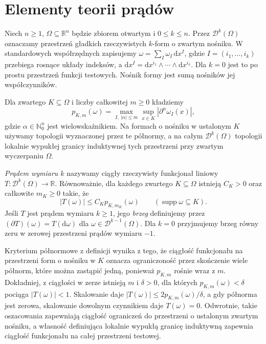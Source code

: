 \section{Elementy teorii prądów}
\begin{definicja}
\label{def:current-29}
Niech $n\ge1$, $\Omega\subseteq\mathbb R^n$
będzie zbiorem otwartym i $0\le k\le n$.
Przez $\mathcal D^k(\Omega)$ oznaczamy przestrzeń
gładkich rzeczywistych $k$-form o zwartym nośniku.
W standardowych współrzędnych zapisujemy
$\omega=\sum_I\omega_I\,\mathrm dx^I$, gdzie
$I=(i_1,\ldots,i_k)$ przebiega rosnące układy
indeksów, a $\mathrm dx^I=\mathrm dx^{i_1}\wedge
\cdots\wedge\mathrm dx^{i_k}$. Dla $k=0$
jest to po prostu przestrzeń funkcji testowych.
Nośnik formy jest sumą nośników jej współczynników.

Dla zwartego $K\subseteq\Omega$ i liczby
całkowitej $m\ge0$ kładziemy
\[
 p_{K,m}(\omega)=
 \max_{I,\ |\alpha|\le m}\sup_{x\in K}
 |\partial^\alpha\omega_I(x)|,
\]
gdzie $\alpha\in\mathbb N_0^n$ jest wielowskaźnikiem.
Na formach o nośniku w ustalonym $K$ używamy
topologii wyznaczonej przez te półnormy, a na
całym $\mathcal D^k(\Omega)$ topologii
lokalnie wypukłej granicy induktywnej tych
przestrzeni przy zwartym wyczerpaniu $\Omega$.

\emph{Prądem wymiaru $k$} nazywamy ciągły
rzeczywisty funkcjonał liniowy
$T:\mathcal D^k(\Omega)\to\mathbb R$.
Równoważnie, dla każdego zwartego $K\subseteq\Omega$
istnieją $C_K>0$ oraz całkowite $m_K\ge0$ takie, że
\[
 |T(\omega)|\le C_Kp_{K,m_K}(\omega)
 \qquad(\operatorname{supp}\omega\subseteq K).
\]
Jeśli $T$ jest prądem wymiaru $k\ge1$, jego
\emph{brzeg} definiujemy przez
$(\partial T)(\omega)=T(\mathrm d\omega)$
dla $\omega\in\mathcal D^{k-1}(\Omega)$.
Dla $k=0$ przyjmujemy brzeg równy zeru
w zerowej przestrzeni prądów wymiaru $-1$.
\end{definicja}

\begin{uwaga}
Kryterium półnormowe z definicji wynika z tego,
że ciągłość funkcjonału na przestrzeni form
o nośniku w $K$ oznacza ograniczoność przez
skończenie wiele półnorm, które można zastąpić
jedną, ponieważ $p_{K,m}$ rośnie wraz z $m$.
Dokładniej, z ciągłości w zerze istnieją
$m$ i $\delta>0$, dla których
$p_{K,m}(\omega)<\delta$ pociąga
$|T(\omega)|<1$. Skalowanie daje
$|T(\omega)|\le 2p_{K,m}(\omega)/\delta$,
a gdy półnorma jest zerowa, skalowanie
dowolnym czynnikiem daje $T(\omega)=0$.
Odwrotnie, takie oszacowania zapewniają
ciągłość ograniczeń do przestrzeni o ustalonym
zwartym nośniku, a własność definiująca
lokalnie wypukłą granicę induktywną
zapewnia ciągłość funkcjonału na całej
przestrzeni testowej.
\end{uwaga}

